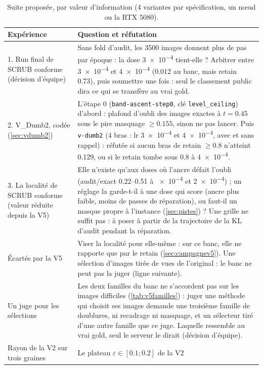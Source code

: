 \documentclass[11pt,a4paper]{article}
\newcommand{\code}[1]{\texttt{#1}}
\begin{document}
\begin{table}[ht]
  \centering\small
  \caption{Suite proposée, par valeur d'information (4 variantes par spécification, un nœud ou la
  RTX 5080).}\label{tab:plan}
  \begin{tabularx}{\linewidth}{@{}>{\raggedright}p{4.2cm}X@{}}
    \toprule
    Expérience & Question et réfutation\\
    \midrule
    1. Run final de SCRUB conforme (décision d'équipe) & Sans fold d'audit, les 3500 images
      donnent plus de pas par époque : la dose \num{3e-4} tient-elle ? Arbitrer entre \num{3e-4} et
      \num{4e-4} (\num{+0.012} au banc, mais retain \num{0.73}), puis soumettre une fois : seul le
      classement public dira ce qui se transfère au vrai gold.\\
    2. V\_Dumb2, codée (\cref{sec:vdumb2}) & L'étape 0 (\code{band-ascent-step0}, clé
      \code{level\_ceiling}) d'abord : plafond d'oubli des images exactes à $t=\num{0.45}$ sous le pire
      masquage $\ge\num{0.155}$, sinon ne pas lancer. Puis \code{v-dumb2} (4 bras : lr \num{3e-4} et
      \num{4e-4}, avec et sans rappel) : réfutée si aucun bras de retain $\ge\num{0.8}$ n'atteint
      \num{0.129}, ou si le retain tombe sous \num{0.8} à \num{4e-4}.\\
    3. La localité de SCRUB conforme (valeur réduite depuis la V5) & Elle n'existe qu'aux doses où l'ancre défait l'oubli
      (audit/exact \numrange{0.22}{0.51} à \num{e-4} et \num{2e-4}) ; un réglage la garde-t-il à une
      dose qui score (ancre plus faible, moins de passes de réparation), ou faut-il un masque propre à
      l'instance (\cref{sec:pistes}) ? Une grille ne suffit pas : à poser à partir de la trajectoire de
      la KL d'audit pendant la réparation.\\
    Écartés par la V5 & Viser la localité pour elle-même : sur ce banc, elle ne rapporte que par le
      retain (\cref{sec:campagnev5}). Une sélection d'images tirée de vues de l'original : le banc ne
      peut pas la juger (ligne suivante).\\
    Un juge pour les sélections & Les deux familles du banc ne s'accordent pas sur les images
      difficiles (\cref{tab:v5familles}) : juger une méthode qui choisit ses images demande une
      troisième famille de doublures, ni recadrage ni masquage, et un sélecteur tiré d'une autre
      famille que ce juge. Laquelle ressemble au vrai gold, seul le serveur le dirait (décision
      d'équipe).\\
    Rayon de la V2 sur trois graines & Le plateau $\varepsilon\in[\num{0.1};\num{0.2}]$ de la V2

\end{tabularx}
\end{table}
\end{document}
